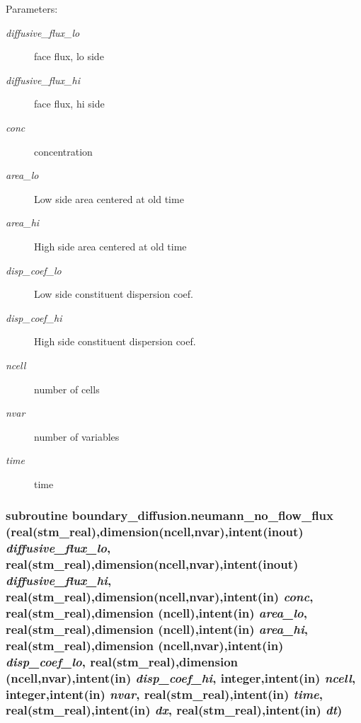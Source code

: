 \label{a00054_02070fde3498e9ffef285f98f6648fb7}


\begin{Desc}
\item[Parameters:]
\begin{description}
\item[{\em diffusive\_\-flux\_\-lo}]face flux, lo side\item[{\em diffusive\_\-flux\_\-hi}]face flux, hi side\item[{\em conc}]concentration \item[{\em area\_\-lo}]Low side area centered at old time\item[{\em area\_\-hi}]High side area centered at old time\item[{\em disp\_\-coef\_\-lo}]Low side constituent dispersion coef.\item[{\em disp\_\-coef\_\-hi}]High side constituent dispersion coef.\item[{\em ncell}]number of cells\item[{\em nvar}]number of variables\item[{\em time}]time \end{description}
\end{Desc}
\hypertarget{a00054_b3856da229d1737207f39f7e94a0e39d}{
\subsubsection[{neumann\_\-no\_\-flow\_\-flux}]{\setlength{\rightskip}{0pt plus 5cm}subroutine boundary\_\-diffusion.neumann\_\-no\_\-flow\_\-flux (real(stm\_\-real),dimension(ncell,nvar),intent(inout) {\em diffusive\_\-flux\_\-lo}, \/  real(stm\_\-real),dimension(ncell,nvar),intent(inout) {\em diffusive\_\-flux\_\-hi}, \/  real(stm\_\-real),dimension(ncell,nvar),intent(in) {\em conc}, \/  real(stm\_\-real),dimension         (ncell),intent(in) {\em area\_\-lo}, \/  real(stm\_\-real),dimension         (ncell),intent(in) {\em area\_\-hi}, \/  real(stm\_\-real),dimension (ncell,nvar),intent(in) {\em disp\_\-coef\_\-lo}, \/  real(stm\_\-real),dimension (ncell,nvar),intent(in) {\em disp\_\-coef\_\-hi}, \/  integer,intent(in) {\em ncell}, \/  integer,intent(in) {\em nvar}, \/  real(stm\_\-real),intent(in) {\em time}, \/  real(stm\_\-real),intent(in) {\em dx}, \/  real(stm\_\-real),intent(in) {\em dt})}}
\label{a00054_b3856da229d1737207f39f7e94a0e39d}


